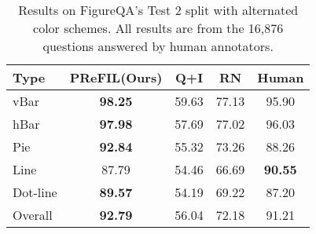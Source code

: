 \documentclass[10pt,twocolumn]{article}
\begin{document}
\begin{table}[]
\footnotesize
\centering
\caption{Results on FigureQA's Test 2 split with alternated color schemes. All results are from the 16,876 questions answered by human annotators.}
\vspace{2pt}
\label{tab:results-figureqa-test}
\begin{tabular}{@{}lcccc@{}}
\toprule
Type & \multicolumn{1}{c}{PReFIL(Ours)} & \multicolumn{1}{c}{Q+I \cite{figureqa}} & \multicolumn{1}{c}{RN \cite{figureqa}} & \multicolumn{1}{c}{Human \cite{figureqa}} \\ \midrule
vBar & \textbf{98.25} & 59.63 & 77.13 & 95.90 \\
hBar & \textbf{97.98} & 57.69 & 77.02 & 96.03 \\
Pie & \textbf{92.84} & 55.32 & 73.26 & 88.26 \\
Line & 87.79 & 54.46 & 66.69 & \textbf{90.55} \\
Dot-line & \textbf{89.57} & 54.19 & 69.22 & 87.20 \\ \midrule
Overall & \textbf{92.79} & 56.04  & 72.18 & 91.21 \\ \bottomrule
\end{tabular}
\end{table}
\end{document}
